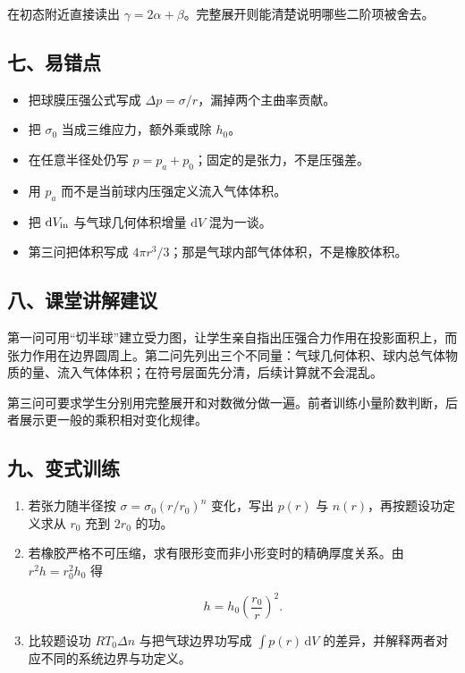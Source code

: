 \documentclass[12pt,a4paper,UTF8]{ctexart}
\newcommand{\tightlist}{\setlength{\itemsep}{0pt}\setlength{\parskip}{0pt}}
\begin{document}
在初态附近直接读出
\(\gamma=2\alpha+\beta\)。完整展开则能清楚说明哪些二阶项被舍去。

\subsection{七、易错点}\label{ux4e03ux6613ux9519ux70b9-4}

\begin{itemize}
\tightlist
\item
  把球膜压强公式写成 \(\Delta p=\sigma/r\)，漏掉两个主曲率贡献。
\item
  把 \(\sigma_0\) 当成三维应力，额外乘或除 \(h_0\)。
\item
  在任意半径处仍写 \(p=p_a+p_0\)；固定的是张力，不是压强差。
\item
  用 \(p_a\) 而不是当前球内压强定义流入气体体积。
\item
  把 \(\mathrm{d}V_{\rm in}\) 与气球几何体积增量 \(\mathrm{d}V\)
  混为一谈。
\item
  第三问把体积写成 \(4\pi r^3/3\)；那是气球内部气体体积，不是橡胶体积。
\end{itemize}

\subsection{八、课堂讲解建议}\label{ux516bux8bfeux5802ux8bb2ux89e3ux5efaux8bae-4}

第一问可用``切半球''建立受力图，让学生亲自指出压强合力作用在投影面积上，而张力作用在边界圆周上。第二问先列出三个不同量：气球几何体积、球内总气体物质的量、流入气体体积；在符号层面先分清，后续计算就不会混乱。

第三问可要求学生分别用完整展开和对数微分做一遍。前者训练小量阶数判断，后者展示更一般的乘积相对变化规律。

\subsection{九、变式训练}\label{ux4e5dux53d8ux5f0fux8badux7ec3-4}

\begin{enumerate}
\def\labelenumi{\arabic{enumi}.}
\item
  若张力随半径按 \(\sigma=\sigma_0(r/r_0)^n\) 变化，写出 \(p(r)\) 与
  \(n(r)\)，再按题设功定义求从 \(r_0\) 充到 \(2r_0\) 的功。
\item
  若橡胶严格不可压缩，求有限形变而非小形变时的精确厚度关系。由
  \(r^2h=r_0^2h_0\) 得

  \[h=h_0\left(\frac{r_0}{r}\right)^2.\]
\item
  比较题设功 \(RT_0\Delta n\) 与把气球边界功写成
  \(\int p(r)\,\mathrm{d}V\)
  的差异，并解释两者对应不同的系统边界与功定义。
\end{enumerate}
\end{document}
